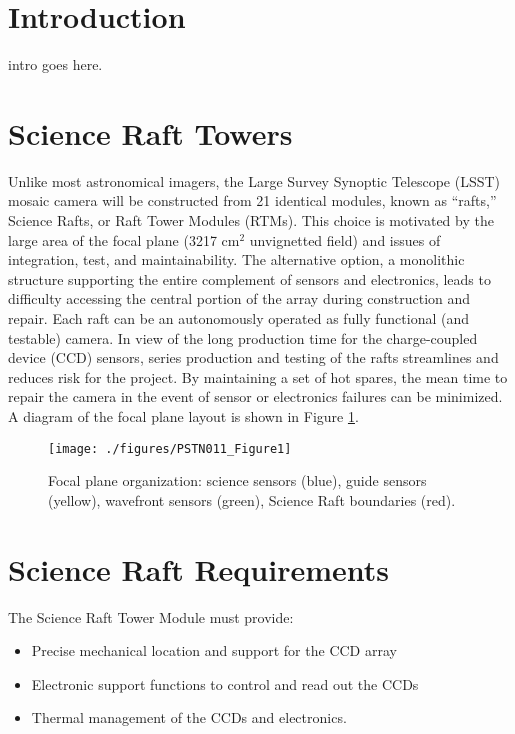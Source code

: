 \section{Introduction}

intro goes here. 

\section{Science Raft Towers}
Unlike most astronomical imagers, the Large Survey Synoptic Telescope (LSST) mosaic camera will be constructed from 21 identical modules, known as “rafts,” Science Rafts, or Raft Tower Modules (RTMs). This choice is motivated by the large area of the focal plane (3217 cm$^2$ unvignetted field) and issues of integration, test, and maintainability. The alternative option, a monolithic structure supporting the entire complement of sensors and electronics, leads to difficulty accessing the central portion of the array during construction and repair. Each raft can be an autonomously operated as fully functional (and testable) camera. In view of the long production time for the charge-coupled device (CCD) sensors, series production and testing of the rafts streamlines and reduces risk for the project. By maintaining a set of hot spares, the mean time to repair the camera in the event of sensor or electronics failures can be minimized. A diagram of the focal plane layout is shown in Figure \ref{fig:Fig1}.
 
\begin{figure}[htbp]
\begin{center}
\texttt{[image: ./figures/PSTN011\_Figure1]}
\caption{Focal plane organization: science sensors (blue), guide sensors (yellow), wavefront sensors (green), Science Raft boundaries (red).}
\label{fig:Fig1}
\end{center}
\end{figure}
 
\section{Science Raft Requirements}
The Science Raft Tower Module must provide: 
\begin{itemize}
\item{} Precise mechanical location and support for the CCD array 
\item{} Electronic support functions to control and read out the CCDs
\item{} Thermal management of the CCDs and electronics.
\end{itemize}

